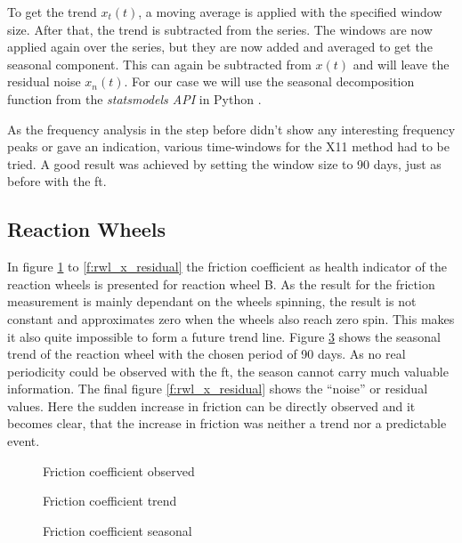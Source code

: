 To get the trend $x_t(t)$, a moving average is applied with the specified window size. After that, the trend is subtracted from the series. The windows are now applied again over the series, but they are now added and averaged to get the seasonal component. This can again be subtracted from $x(t)$ and will leave the residual noise $x_n(t)$. \newline
For our case we will use the seasonal decomposition function from the \textit{statsmodels API} in Python \cite{statsmodels}.

As the frequency analysis in the step before didn't show any interesting frequency peaks or gave an indication, various time-windows for the X11 method had to be tried. A good result was achieved by setting the window size to 90 days, just as before with the \ac{ft}.

\subsection{Reaction Wheels}
In figure \ref{f:rwl_x_observed} to \ref{f:rwl_x_residual} the friction coefficient as health indicator of the reaction wheels is presented for reaction wheel B. As the result for the friction measurement is mainly dependant on the wheels spinning, the result is not constant and approximates zero when the wheels also reach zero spin. This makes it also quite impossible to form a future trend line. Figure \ref{f:rwl_x_seasonal} shows the seasonal trend of the reaction wheel with the chosen period of 90 days. As no real periodicity could be observed with the \ac{ft}, the season cannot carry much valuable information. The final figure \ref{f:rwl_x_residual} shows the \enquote{noise} or residual values. Here the sudden increase in friction can be directly observed and it becomes clear, that the increase in friction was neither a trend nor a predictable event.

\begin{figure}[H]
\centering

\caption{Friction coefficient observed}
\label{f:rwl_x_observed}
\end{figure}

\begin{figure}[H]
\centering

\caption{Friction coefficient trend}
\label{f:rwl_x_trend}
\end{figure}

\begin{figure}[H]
\centering

\caption{Friction coefficient seasonal}
\label{f:rwl_x_seasonal}
\end{figure}

